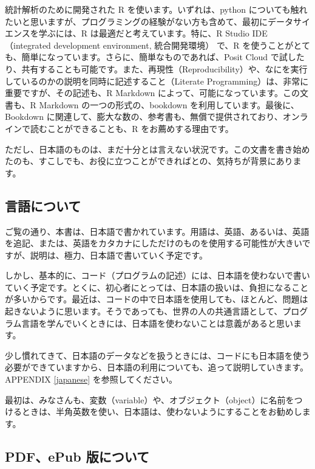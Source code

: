 \documentclass[
]{bxjsbook}
\theoremstyle{definition}
\theoremstyle{definition}
\theoremstyle{definition}
\theoremstyle{definition}
\theoremstyle{remark}
\begin{document}
統計解析のために開発された R を使います。いずれは、python についても触れたいと思いますが、プログラミングの経験がない方も含めて、最初にデータサイエンスを学ぶには、R は最適だと考えています。特に、R Studio IDE（integrated development environment, 統合開発環境） で、R を使うことがとても、簡単になっています。さらに、簡単なものであれば、Posit Cloud で試したり、共有することも可能です。また、再現性（Reproducibility）や、なにを実行しているのかの説明を同時に記述すること（Literate Programming）は、非常に重要ですが、その記述も、R Markdown によって、可能になっています。この文書も、R Markdown の一つの形式の、bookdown を利用しています。最後に、Bookdown に関連して、膨大な数の、参考書も、無償で提供されており、オンラインで読むことができることも、R をお薦めする理由です。

ただし、日本語のものは、まだ十分とは言えない状況です。この文書を書き始めたのも、すこしでも、お役に立つことができればとの、気持ちが背景にあります。

\hypertarget{ux8a00ux8a9eux306bux3064ux3044ux3066}{%
\subsection*{言語について}\label{ux8a00ux8a9eux306bux3064ux3044ux3066}}

ご覧の通り、本書は、日本語で書かれています。用語は、英語、あるいは、英語を追記、または、英語をカタカナにしただけのものを使用する可能性が大きいですが、説明は、極力、日本語で書いていく予定です。

しかし、基本的に、コード（プログラムの記述）には、日本語を使わないで書いていく予定です。とくに、初心者にとっては、日本語の扱いは、負担になることが多いからです。最近は、コードの中で日本語を使用しても、ほとんど、問題は起きないように思います。そうであっても、世界の人の共通言語として、プログラム言語を学んでいくときには、日本語を使わないことは意義があると思います。

少し慣れてきて、日本語のデータなどを扱うときには、コードにも日本語を使う必要ができていますから、日本語の利用についても、追って説明していきます。APPENDIX \ref{japanese} を参照してください。

最初は、みなさんも、変数（variable）や、オブジェクト（object）に名前をつけるときは、半角英数を使い、日本語は、使わないようにすることをお勧めします。

\hypertarget{pdfepub-ux7248ux306bux3064ux3044ux3066}{%
\subsection*{PDF、ePub 版について}\label{pdfepub-ux7248ux306bux3064ux3044ux3066}}
\end{document}
